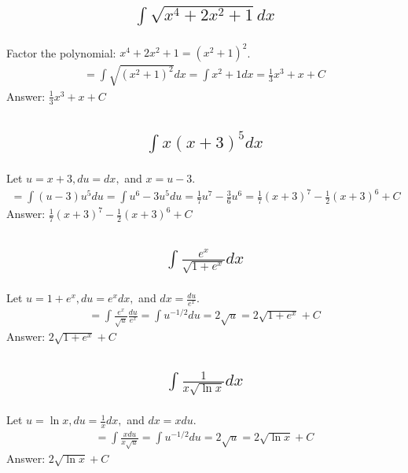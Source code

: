 \documentclass{article}
\begin{document}
\subsection{
	\begin{align*}
		\int{\sqrt{x^4 + 2x^2 + 1} dx}
	\end{align*}
}
Factor the polynomial: $x^4 + 2x^2 + 1 = (x^2 + 1)^2$.
\begin{align*}
	= \int{\sqrt{(x^2 + 1)^2} dx} = \int{x^2 + 1 dx} = \frac{1}{3}x^3 + x + C
\end{align*}
Answer: $\frac{1}{3}x^3 + x + C$

\subsection{
	\begin{align*}
		\int{x(x + 3)^5 dx}
	\end{align*}
}
Let $u = x + 3, du = dx,$ and $x = u - 3$. 
\begin{align*}
	= \int{(u - 3) u^5 du} = \int{u^6 - 3u^5 du} = \frac{1}{7} u^7 - \frac{3}{6} u^6 = \frac{1}{7} (x + 3)^7 - \frac{1}{2} (x + 3)^6 + C
\end{align*}
Answer: $\frac{1}{7} (x + 3)^7 - \frac{1}{2} (x + 3)^6 + C$

\subsection{
	\begin{align*}
		\int{\frac{e^x}{\sqrt{1 + e^x}} dx}
	\end{align*}
}
Let $u = 1 + e^x, du = e^x dx,$ and $dx = \frac{du}{e^x}$. 
\begin{align*}
	= \int{\frac{e^x}{\sqrt{u}} \frac{du}{e^x}} = \int{u^{-1/2} du} = 2 \sqrt{u} = 2 \sqrt{1 + e^x} + C
\end{align*}
Answer: $2 \sqrt{1 + e^x} + C$

\subsection{
	\begin{align*}
		\int{\frac{1}{x\sqrt{\ln{x}}} dx}
	\end{align*}
}
Let $u = \ln{x}, du = \frac{1}{x} dx,$ and $dx = x du$. 
\begin{align*}
	= \int{\frac{x du}{x \sqrt{u}}} = \int{u^{-1/2} du} = 2 \sqrt{u} = 2\sqrt{\ln{x}} + C
\end{align*}
Answer: $2\sqrt{\ln{x}} + C$
\end{document}
